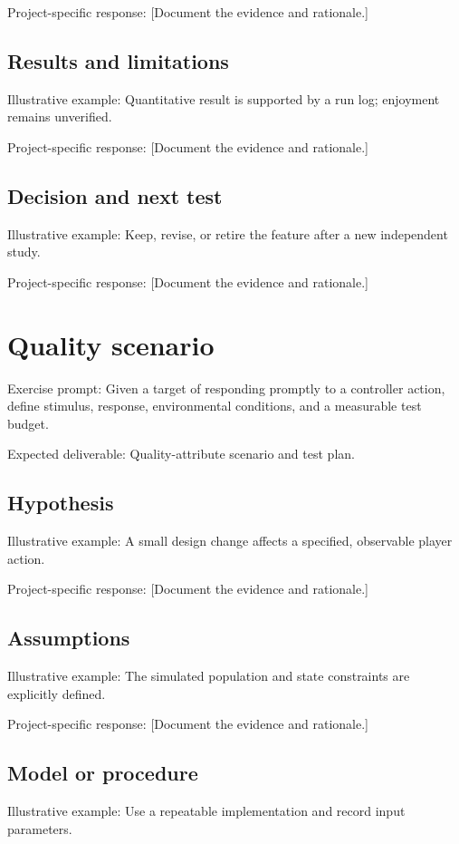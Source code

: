 \documentclass[11pt]{article}
\begin{document}
Project-specific response: [Document the evidence and rationale.]


\subsection{Results and limitations}
Illustrative example: Quantitative result is supported by a run log; enjoyment remains unverified.

Project-specific response: [Document the evidence and rationale.]


\subsection{Decision and next test}
Illustrative example: Keep, revise, or retire the feature after a new independent study.

Project-specific response: [Document the evidence and rationale.]


\section{Quality scenario}
Exercise prompt: Given a target of responding promptly to a controller action, define stimulus, response, environmental conditions, and a measurable test budget.

Expected deliverable: Quality-attribute scenario and test plan.


\subsection{Hypothesis}
Illustrative example: A small design change affects a specified, observable player action.

Project-specific response: [Document the evidence and rationale.]


\subsection{Assumptions}
Illustrative example: The simulated population and state constraints are explicitly defined.

Project-specific response: [Document the evidence and rationale.]


\subsection{Model or procedure}
Illustrative example: Use a repeatable implementation and record input parameters.
\end{document}
